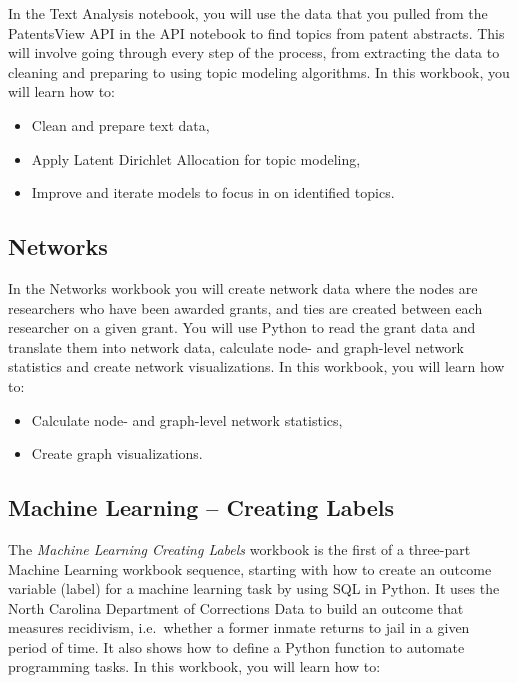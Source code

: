 \documentclass[]{krantz}
\begin{document}
In the Text Analysis notebook, you will use the data that you pulled
from the PatentsView API in the API notebook to find topics from patent
abstracts. This will involve going through every step of the process,
from extracting the data to cleaning and preparing to using topic
modeling algorithms. In this workbook, you will learn how to:

\begin{itemize}
\item
  Clean and prepare text data,
\item
  Apply Latent Dirichlet Allocation for topic modeling,
\item
  Improve and iterate models to focus in on identified topics.
\end{itemize}

\subsection{Networks}\label{networks}

In the Networks workbook you will create network data where the nodes
are researchers who have been awarded grants, and ties are created
between each researcher on a given grant. You will use Python to read
the grant data and translate them into network data, calculate node- and
graph-level network statistics and create network visualizations. In
this workbook, you will learn how to:

\begin{itemize}
\item
  Calculate node- and graph-level network statistics,
\item
  Create graph visualizations.
\end{itemize}

\subsection{Machine Learning -- Creating
Labels}\label{machine-learning-creating-labels}

The \emph{Machine Learning Creating Labels} workbook is the first of a
three-part Machine Learning workbook sequence, starting with how to
create an outcome variable (label) for a machine learning task by using
SQL in Python. It uses the North Carolina Department of Corrections Data
to build an outcome that measures recidivism, i.e.~whether a former
inmate returns to jail in a given period of time. It also shows how to
define a Python function to automate programming tasks. In this
workbook, you will learn how to:
\end{document}
